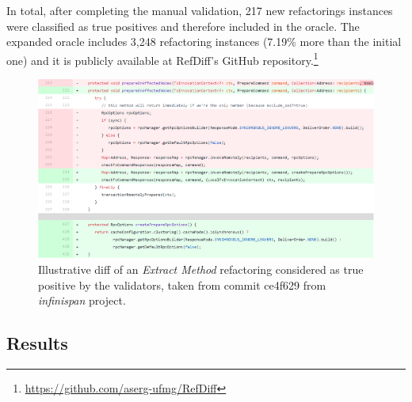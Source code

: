 In total, after completing the manual validation, 217 new refactorings instances were classified as true positives and therefore included in the oracle.
The expanded oracle includes 3,248 refactoring instances (7.19\% more than the initial one) and it is publicly available at RefDiff's GitHub repository.\footnote{\url{https://github.com/aserg-ufmg/RefDiff}}


\begin{figure}[htpb]
\centering
\includegraphics[width=1.0\textwidth]{img/ex-new-extract-infinispan-ce4f629.png}
\caption{Illustrative diff of an \emph{Extract Method} refactoring considered as true positive by the validators, taken from commit ce4f629 from \emph{infinispan} project.}
\label{FigDiff3}
\end{figure}



\subsection{Results}
\label{sec:eval:java:results}

